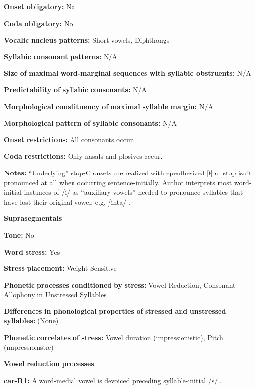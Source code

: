 \begin{styleBody}
\textbf{Onset} \textbf{obligatory:} No

\textbf{Coda} \textbf{obligatory:} No

\textbf{Vocalic} \textbf{nucleus} \textbf{patterns:} Short vowels, Diphthongs

\textbf{Syllabic} \textbf{consonant} \textbf{patterns:} N/A

\textbf{Size} \textbf{of} \textbf{maximal} \textbf{word{}-marginal sequences with syllabic obstruents:} N/A

\textbf{Predictability} \textbf{of} \textbf{syllabic} \textbf{consonants:} N/A

\textbf{Morphological} \textbf{constituency} \textbf{of} \textbf{maximal} \textbf{syllable} \textbf{margin:} N/A

\textbf{Morphological} \textbf{pattern} \textbf{of} \textbf{syllabic} \textbf{consonants:} N/A

\textbf{Onset} \textbf{restrictions:} All consonants occur.

\textbf{Coda} \textbf{restrictions:} Only nasals and plosives occur.

\textbf{Notes:} “Underlying” stop-C onsets are realized with epenthesized [ɨ] or stop isn’t pronounced at all when occurring sentence-initially. Author interprets most word-initial instances of /ɨ/ as “auxiliary vowels” needed to pronounce syllables that have lost their original vowel; e.g. /ɨnta/ \citep[26]{Courtz2008}.

\textbf{Suprasegmentals}

\textbf{Tone:} No

\textbf{Word} \textbf{stress:} Yes

\textbf{Stress} \textbf{placement:} Weight-Sensitive

\textbf{Phonetic} \textbf{processes} \textbf{conditioned} \textbf{by} \textbf{stress:} Vowel Reduction, Consonant Allophony in Unstressed Syllables

\textbf{Differences} \textbf{in} \textbf{phonological} \textbf{properties} \textbf{of} \textbf{stressed} \textbf{and} \textbf{unstressed} \textbf{syllables:} (None)

\textbf{Phonetic} \textbf{correlates} \textbf{of} \textbf{stress:} Vowel duration (impressionistic), Pitch (impressionistic)

\textbf{Vowel} \textbf{reduction} \textbf{processes}

\textbf{car-R1:} A word-medial vowel is devoiced preceding syllable-initial /s/ \citep[38]{Peasgood1972}.


\end{styleBody}
